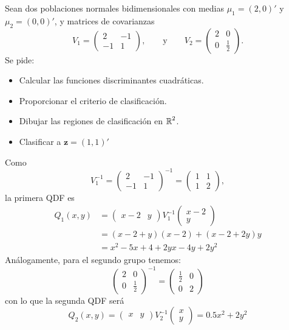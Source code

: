 Sean dos poblaciones normales bidimensionales con medias $\mu_1=(2,0)'$ y $\mu_2=(0,0)'$, y matrices de covarianzas \[ V_1=\begin{pmatrix}
2 & -1\\
-1 & 1
\end{pmatrix},\qquad\text{y}\qquad V_2=\begin{pmatrix}
2 & 0\\
0 & \tfrac{1}{2}
\end{pmatrix}. \]
Se pide:
\begin{itemize}
\item Calcular las funciones discriminantes cuadráticas.
\item Proporcionar el criterio de clasificación.
\item Dibujar las regiones de clasificación en $\operatorname{\mathbb{R}}^2$.
\item Clasificar a $\mathbf{z}=(1,1)'$
\end{itemize}
Como \[ V_1^{-1}=\begin{pmatrix}
2 & -1\\
-1 & 1
\end{pmatrix}^{-1}=\begin{pmatrix}
1 & 1\\
1 & 2
\end{pmatrix}, \]la primera QDF es \[ \begin{aligned}
Q_1(x,y)&=\begin{pmatrix}
x-2 & y
\end{pmatrix}V_1^{-1}\begin{pmatrix}
x-2\\
y
\end{pmatrix}\\
&=(x-2+y)(x-2)+(x-2+2y)y\\
&=x^2-5x+4+2yx-4y+2y^2
\end{aligned} \]
Análogamente, para el segundo grupo tenemos: \[ \begin{pmatrix}
2 & 0\\
0 & \tfrac{1}{2}
\end{pmatrix}^{-1}=\begin{pmatrix}
\tfrac{1}{2} & 0\\
0 & 2
\end{pmatrix} \]con lo que la segunda QDF será \[ Q_2(x,y)=\begin{pmatrix}
x & y
\end{pmatrix}V_2^{-1}\begin{pmatrix}
x\\
y
\end{pmatrix}=0.5x^2+2y^2 \]

